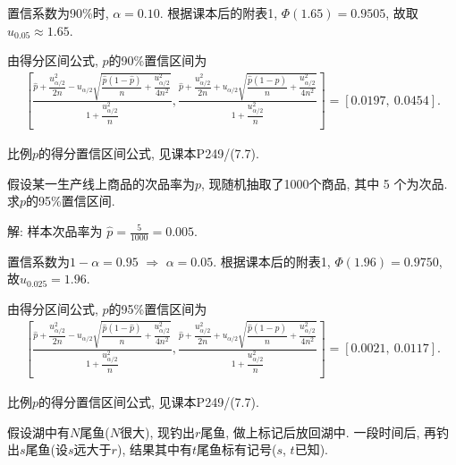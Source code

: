 \documentclass[standard]{ExBook}
\renewenvironment{shaded}{%
  \def\FrameCommand{\fboxsep=\FrameSep \colorbox{shadecolor}}%
  \MakeFramed{\advance\hsize-\width \FrameRestore}%
}{%
  \endMakeFramed
}
\begin{document}
\begin{qitems}
置信系数为90\%时, $\alpha=0.10$. 根据课本后的附表1, $\Phi(1.65)=0.9505$, 故取$u_{0.05}\approx1.65$.

由得分区间公式, $p$的90\%置信区间为
$$
\begin{aligned}
\left[
\frac{\widehat{p}+\dfrac{u_{\alpha/2}^2}{2n}
-u_{\alpha/2}\sqrt{\dfrac{\widehat{p}(1-\widehat{p})}{n}
+\dfrac{u_{\alpha/2}^2}{4n^2}}}
{1+\dfrac{u_{\alpha/2}^2}{n}},
\frac{\widehat{p}+\dfrac{u_{\alpha/2}^2}{2n}
+u_{\alpha/2}\sqrt{\dfrac{\widehat{p}(1-\widehat{p})}{n}
+\dfrac{u_{\alpha/2}^2}{4n^2}}}
{1+\dfrac{u_{\alpha/2}^2}{n}}
\right]
=
[0.0197,\ 0.0454].
\end{aligned}
$$

\textcolor{themeColor}{\selectfont {}
比例$p$的得分置信区间公式, 见课本P249/(7.7).}

\vspace{2.5cm-5em}

    \begin{bbox}
    \begin{shaded}
        \qitem
假设某一生产线上商品的次品率为$p$, 现随机抽取了1000个商品, 其中 5 个为次品. 求$p$的95\%置信区间.
    \end{shaded}
    \end{bbox}

\vspace{\dimexpr2.5cm-5em\relax}

解: 样本次品率为
$
\widehat{p}=\frac{5}{1000}=0.005.
$

置信系数为$1-\alpha=0.95$ $\Longrightarrow$ $\alpha=0.05$. 根据课本后的附表1, $\Phi(1.96)=0.9750$, 故$u_{0.025}=1.96$.

由得分区间公式, $p$的95\%置信区间为
$$
\begin{aligned}
\left[
\frac{\widehat{p}+\dfrac{u_{\alpha/2}^2}{2n}
-u_{\alpha/2}\sqrt{\dfrac{\widehat{p}(1-\widehat{p})}{n}
+\dfrac{u_{\alpha/2}^2}{4n^2}}}
{1+\dfrac{u_{\alpha/2}^2}{n}},
\frac{\widehat{p}+\dfrac{u_{\alpha/2}^2}{2n}
+u_{\alpha/2}\sqrt{\dfrac{\widehat{p}(1-\widehat{p})}{n}
+\dfrac{u_{\alpha/2}^2}{4n^2}}}
{1+\dfrac{u_{\alpha/2}^2}{n}}
\right]
=
[0.0021,\ 0.0117].
\end{aligned}
$$

\textcolor{themeColor}{\selectfont {}
比例$p$的得分置信区间公式, 见课本P249/(7.7).}

\vspace{2.5cm-5em}

    \begin{bbox}
    \begin{shaded}
        \qitem
假设湖中有$N$尾鱼($N$很大), 现钓出$r$尾鱼, 做上标记后放回湖中. 一段时间后, 再钓出$s$尾鱼(设$s$远大于$r$), 结果其中有$t$尾鱼标有记号($s$, $t$已知).


\end{shaded}
\end{bbox}
\end{qitems}
\end{document}
